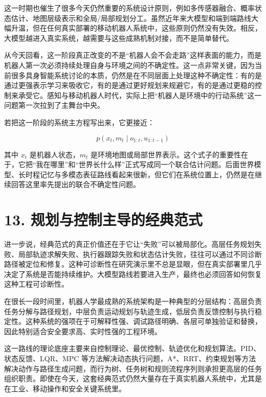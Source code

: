 这一时期也催生了很多今天仍然重要的系统设计原则，例如多传感器融合、概率状态估计、地图层级表示和全局/局部规划分工。虽然近年来大模型和端到端路线大幅升温，但在任何真实部署的移动机器人系统中，这些原则仍然没有失效。相反，大模型越进入真实系统，越需要与这些成熟机制对接，而不是简单替代。

从今天回看，这一阶段真正改变的不是“机器人会不会走路”这样表面的能力，而是机器人第一次必须持续处理自身与环境之间的不确定性。这一点非常关键，因为当前很多具身智能系统讨论的本质，仍然是在不同层面上处理这种不确定性：有的是通过更强表示学习来吸收它，有的是通过更好规划来规避它，有的是通过更稳的控制来承受它。感知与移动机器人时代，实际上把“机器人是环境中的行动系统”这一问题第一次拉到了主舞台中央。

若把这一阶段的系统主方程写出来，它更接近：

\begin{equation*}
p(x_t, m_t \mid o_{1:t}, u_{1:t-1})
\end{equation*}

其中 \(x_t\) 是机器人状态，\(m_t\) 是环境地图或局部世界表示。这个式子的重要性在于，它把“我在哪里”和“世界长什么样”正式写成同一个联合估计问题。后面世界模型、长时程记忆与多模态表征路线看起来很新，但它们在系统位置上，仍然是在继续回答这里率先提出的联合不确定性问题。

\chapter*{13. 规划与控制主导的经典范式}

进一步说，经典范式的真正价值还在于它让“失败”可以被局部化。高层任务规划失败、局部轨迹求解失败、执行器跟踪失败和状态估计失败，往往可以通过不同诊断路径被定位和修复。这种可诊断性在研究演示里不总是显眼，但在真实部署里几乎决定了系统是否能持续维护。大模型路线若要进入生产，最终也必须回答如何恢复这种工程可诊断性。

在很长一段时间里，机器人学最成熟的系统架构是一种典型的分层结构：高层负责任务分解与路径规划，中层负责运动规划与轨迹生成，低层负责反馈控制与执行稳定性。这种系统的强项在于可解释性强、调试路径明确、各层可单独验证和替换，因此特别适合安全要求高、实时性强的工程环境。

这一路线的理论底座主要来自控制理论、最优控制、轨迹优化和规划算法。PID、状态反馈、LQR、MPC 等方法解决动态执行问题，A*、RRT、约束规划等方法解决动作与路径生成问题，而行为树、任务树和规则流程序列则承担更高层的任务组织职责。即使在今天，这套经典范式仍然大量存在于真实机器人系统中，尤其是在工业、移动操作和安全关键系统里。

